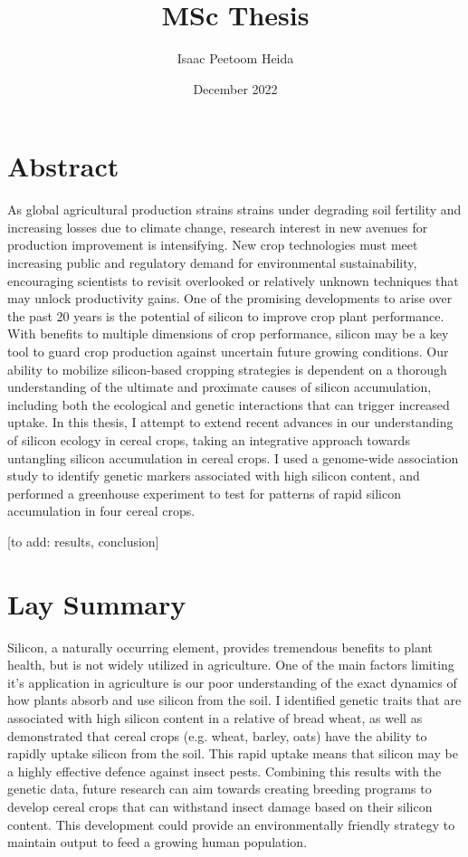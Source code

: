 \documentclass[12pt, letterpaper, ]{article}
\title{MSc Thesis}
\author{Isaac Peetoom Heida}
\date{December 2022}
\begin{document}


\tableofcontents

\section{Abstract}

As global agricultural production strains strains under degrading soil fertility and increasing losses due to climate change, research interest in new avenues for production improvement is intensifying. New crop technologies must meet increasing public and regulatory demand for environmental sustainability, encouraging scientists to revisit overlooked or relatively unknown techniques that may unlock productivity gains. One of the promising developments to arise over the past 20 years is the potential of silicon to improve crop plant performance. With benefits to multiple dimensions of crop performance, silicon may be a key tool to guard crop production against uncertain future growing conditions. Our ability to mobilize silicon-based cropping strategies is dependent on a thorough understanding of the ultimate and proximate causes of silicon accumulation, including both the ecological and genetic interactions that can trigger increased uptake. In this thesis, I attempt to extend recent advances in our understanding of silicon ecology in cereal crops, taking an integrative approach towards untangling silicon accumulation in cereal crops. I used a genome-wide association study to identify genetic markers associated with high silicon content, and performed a greenhouse experiment to test for patterns of rapid silicon accumulation in four cereal crops. 

[to add: results, conclusion]

\section{Lay Summary}

Silicon, a naturally occurring element, provides tremendous benefits to plant health, but is not widely utilized in agriculture. One of the main factors limiting it's application in agriculture is our poor understanding of the exact dynamics of how plants absorb and use silicon from the soil. I identified genetic traits that are associated with high silicon content in a relative of bread wheat, as well as demonstrated that cereal crops (e.g. wheat, barley, oats) have the ability to rapidly uptake silicon from the soil. This rapid uptake means that silicon may be a highly effective defence against insect pests. Combining this results with the genetic data, future research can aim towards creating breeding programs to develop cereal crops that can withstand insect damage based on their silicon content. This development could provide an environmentally friendly strategy to maintain output to feed a growing human population.
\end{document}
